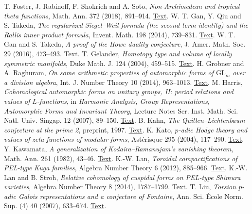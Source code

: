  T. Foster, J. Rabinoff, F. Shokrieh and A. Soto, \emph{Non-Archimedean and tropical theta functions}, Math. Ann. 372 (2018), 891--914. \href{https://arxiv.org/abs/1705.08212}{Text}.
 W. T. Gan, Y. Qiu and S. Takeda, \emph{The regularized Siegel--Weil formula (the second term identity) and the Rallis inner product formula}, Invent. Math. 198 (2014), 739--831. \href{https://arxiv.org/pdf/1207.4709}{Text}.
 W. T. Gan and S. Takeda, \emph{A proof of the Howe duality conjecture}, J. Amer. Math. Soc. 29 (2016), 473--493. \href{https://doi.org/10.1090/jams/839}{Text}.
 T. Gelander, \emph{Homotopy type and volume of locally symmetric manifolds}, Duke Math. J. 124 (2004), 459--515. \href{https://arxiv.org/pdf/math/0111165}{Text}.
 H. Grobner and A. Raghuram, \emph{On some arithmetic properties of automorphic forms of $\mathrm{GL}_m$ over a division algebra}, Int. J. Number Theory 10 (2014), 963--1013. \href{https://homepage.univie.ac.at/harald.grobner/papers/GLn(D).pdf}{Text}.
 M. Harris, \emph{Cohomological automorphic forms on unitary groups, II: period relations and values of $L$-functions}, in \emph{Harmonic Analysis, Group Representations, Automorphic Forms and Invariant Theory}, Lecture Notes Ser. Inst. Math. Sci. Natl. Univ. Singap. 12 (2007), 89--150. \href{https://webusers.imj-prg.fr/~michael.harris/periodrelations.pdf}{Text}.
 B. Kahn, \emph{The Quillen--Lichtenbaum conjecture at the prime 2}, preprint, 1997. \href{https://webusers.imj-prg.fr/~bruno.kahn/preprints/QL2.pdf}{Text}.
 K. Kato, \emph{$p$-adic Hodge theory and values of zeta functions of modular forms}, Astérisque 295 (2004), 117--290. \href{https://www.numdam.org/item/AST_2004__295__117_0/}{Text}.
 Y. Kawamata, \emph{A generalization of Kodaira--Ramanujam's vanishing theorem}, Math. Ann. 261 (1982), 43--46. \href{https://doi.org/10.1007/BF01456407}{Text}.
 K.-W. Lan, \emph{Toroidal compactifications of PEL-type Kuga families}, Algebra Number Theory 6 (2012), 885--966. \href{https://msp.org/ant/2012/6-5/ant-v6-n5-p02-p.pdf}{Text}.
 K.-W. Lan and B. Stroh, \emph{Relative cohomology of cuspidal forms on PEL-type Shimura varieties}, Algebra Number Theory 8 (2014), 1787--1799. \href{https://www.kwlan.org/articles/rel-cusp-PEL.pdf}{Text}.
 T. Liu, \emph{Torsion $p$-adic Galois representations and a conjecture of Fontaine}, Ann. Sci. École Norm. Sup. (4) 40 (2007), 633--674. \href{https://www.numdam.org/item/10.1016/j.ansens.2007.05.002.pdf}{Text}.
